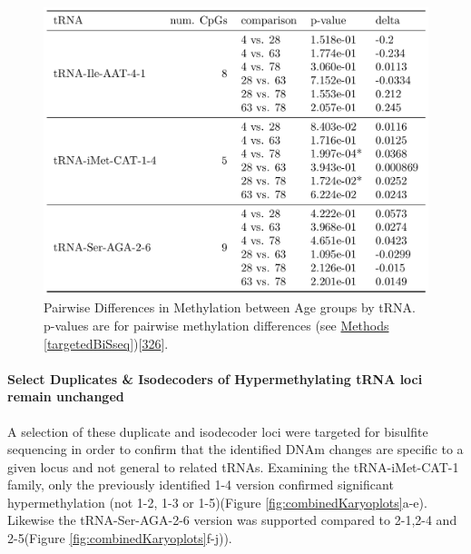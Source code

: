 \documentclass[
]{book}
\begin{document}
\begin{figure}

{\centering \includegraphics[width=1\linewidth]{./figs/pairwiseTab} 

}

\caption{Pairwise Differences in Methylation between Age groups by tRNA. p-values are for pairwise methylation differences (see \protect\hyperlink{targetedBiSseq}{Methods} \ref{targetedBiSseq}){[}\protect\hyperlink{ref-Muller2019}{326}{]}.}\label{fig:pairwiseTab}
\end{figure}



\hypertarget{select-duplicates-isodecoders-of-hypermethylating-trna-loci-remain-unchanged}{%
\paragraph{Select Duplicates \& Isodecoders of Hypermethylating tRNA loci remain unchanged}\label{select-duplicates-isodecoders-of-hypermethylating-trna-loci-remain-unchanged}}

A selection of these duplicate and isodecoder loci were targeted for bisulfite sequencing in order to confirm that the identified DNAm changes are specific to a given locus and not general to related tRNAs.
Examining the tRNA-iMet-CAT-1 family, only the previously identified 1-4 version confirmed significant hypermethylation (not 1-2, 1-3 or 1-5)(Figure \ref{fig:combinedKaryoplots}a-e). Likewise the tRNA-Ser-AGA-2-6 version was supported compared to 2-1,2-4 and 2-5(Figure \ref{fig:combinedKaryoplots}f-j)).
\end{document}
